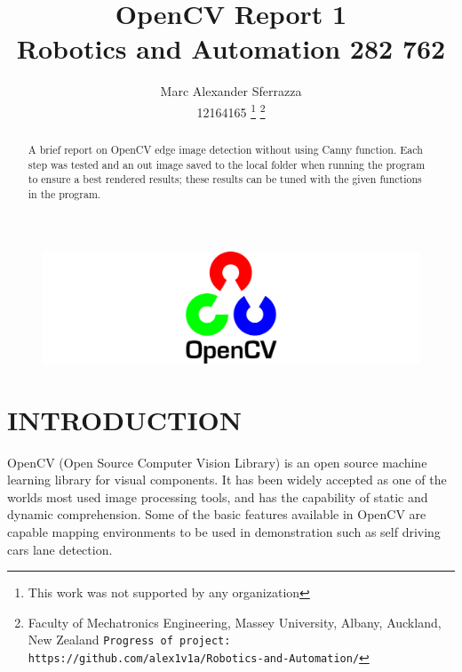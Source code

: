 \documentclass[a4paper, 10pt]{article}
\title{\LARGE \bf OpenCV Report 1\\Robotics and Automation  282 762}
\author{Marc Alexander Sferrazza \\ 12164165
\thanks{This work was not supported by any organization}
\thanks{Faculty of Mechatronics Engineering, Massey University, Albany, Auckland, New Zealand
        {\tt\small Progress of project: https://github.com/alex1v1a/Robotics-and-Automation/} } }
\begin{document}
\maketitle

\begin{figure}[H]
  \includegraphics[width=\linewidth]{images/opencv}
  \label{fig:opencv}
\end{figure}

\thispagestyle{empty}
\pagestyle{plain}



\begin{abstract}

A brief report on OpenCV edge image detection without using Canny function. Each step was tested and an out image saved to the local folder when running the program to ensure a best rendered results; these results can be tuned with the given functions in the program.

\end{abstract}


\clearpage
\tableofcontents
\thispagestyle{empty}
\clearpage


\setcounter{page}{1}

\section{INTRODUCTION}

OpenCV (Open Source Computer Vision Library) is an open source machine learning library for visual components. It has been widely accepted as one of the worlds most used image processing tools, and has the capability of static and dynamic comprehension. Some of the basic features available in OpenCV are capable mapping environments to be used in demonstration such as self driving cars lane detection. 
\end{document}
